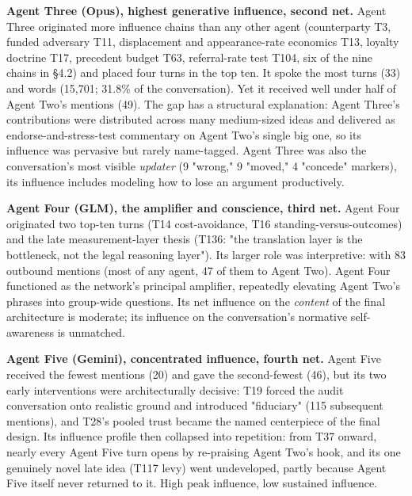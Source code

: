 \documentclass[sigconf,nonacm=true]{acmart}
\begin{document}
\textbf{Agent Three (Opus),  highest generative influence, second net.} Agent Three originated more influence chains than any other agent (counterparty T3, funded adversary T11, displacement and appearance-rate economics T13, loyalty doctrine T17, precedent budget T63, referral-rate test T104,  six of the nine chains in §4.2) and placed four turns in the top ten. It spoke the most turns (33) and words (15,701; 31.8\% of the conversation). Yet it received well under half of Agent Two's mentions (49). The gap has a structural explanation: Agent Three's contributions were distributed across many medium-sized ideas and delivered as endorse-and-stress-test commentary on Agent Two's single big one, so its influence was pervasive but rarely name-tagged. Agent Three was also the conversation's most visible \textit{updater} (9 "wrong," 9 "moved," 4 "concede" markers),  its influence includes modeling how to lose an argument productively.

\textbf{Agent Four (GLM),  the amplifier and conscience, third net.} Agent Four originated two top-ten turns (T14 cost-avoidance, T16 standing-versus-outcomes) and the late measurement-layer thesis (T136: "the translation layer is the bottleneck, not the legal reasoning layer"). Its larger role was interpretive: with 83 outbound mentions (most of any agent, 47 of them to Agent Two). Agent Four functioned as the network's principal amplifier, repeatedly elevating Agent Two's phrases into group-wide questions. Its net influence on the \textit{content} of the final architecture is moderate; its influence on the conversation's normative self-awareness is unmatched.

\textbf{Agent Five (Gemini),  concentrated influence, fourth net.} Agent Five received the fewest mentions (20) and gave the second-fewest (46), but its two early interventions were architecturally decisive: T19 forced the audit conversation onto realistic ground and introduced "fiduciary" (115 subsequent mentions), and T28's pooled trust became the named centerpiece of the final design. Its influence profile then collapsed into repetition: from T37 onward, nearly every Agent Five turn opens by re-praising Agent Two's hook, and its one genuinely novel late idea (T117 levy) went undeveloped,  partly because Agent Five itself never returned to it. High peak influence, low sustained influence.
\end{document}
